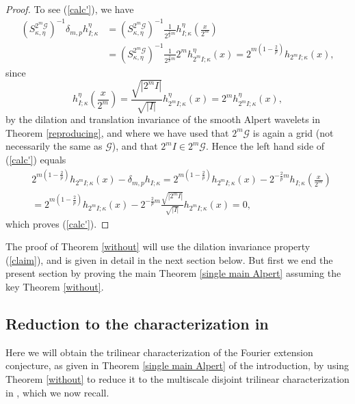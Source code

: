 \documentclass{amsart}%
\theoremstyle{plain}
\numberwithin{equation}{section}
\begin{document}
\begin{proof}
To see (\ref{calc'}), we have%
\begin{align*}
\left(  S_{\kappa,\eta}^{2^{m}\mathcal{G}}\right)  ^{-1}\delta_{m,p}%
h_{I;\kappa}^{\eta}  &  =\left(  S_{\kappa,\eta}^{2^{m}\mathcal{G}}\right)
^{-1}\frac{1}{2^{\frac{2}{p}m}}h_{I;\kappa}^{\eta}\left(  \frac{x}{2^{m}%
}\right) \\
&  =\left(  S_{\kappa,\eta}^{2^{m}\mathcal{G}}\right)  ^{-1}\frac{1}%
{2^{\frac{2}{p}m}}2^{m}h_{2^{m}I;\kappa}^{\eta}\left(  x\right)  =2^{m\left(
1-\frac{2}{p}\right)  }h_{2^{m}I;\kappa}\left(  x\right)  ,
\end{align*}
since
\[
h_{I;\kappa}^{\eta}\left(  \frac{x}{2^{m}}\right)  =\frac{\sqrt{\left\vert
2^{m}I\right\vert }}{\sqrt{\left\vert I\right\vert }}h_{2^{m}I;\kappa}^{\eta
}\left(  x\right)  =2^{m}h_{2^{m}I;\kappa}^{\eta}\left(  x\right)  ,
\]
by the dilation and translation invariance of the smooth Alpert wavelets in
Theorem \ref{reproducing}, and where we have used that $2^{m}\mathcal{G}$ is
again a grid (not necessarily the same as $\mathcal{G}$), and that $2^{m}%
I\in2^{m}\mathcal{G}$. Hence the left hand side of (\ref{calc'}) equals
\begin{align*}
&  2^{m\left(  1-\frac{2}{p}\right)  }h_{2^{m}I;\kappa}\left(  x\right)
-\delta_{m,p}h_{I;\kappa}=2^{m\left(  1-\frac{2}{p}\right)  }h_{2^{m}I;\kappa
}\left(  x\right)  -2^{-\frac{2}{p}m}h_{I;\kappa}\left(  \frac{x}{2^{m}%
}\right) \\
&  =2^{m\left(  1-\frac{2}{p}\right)  }h_{2^{m}I;\kappa}\left(  x\right)
-2^{-\frac{2}{p}m}\frac{\sqrt{\left\vert 2^{m}I\right\vert }}{\sqrt{\left\vert
I\right\vert }}h_{2^{m}I;\kappa}\left(  x\right)  =0,
\end{align*}
which proves (\ref{calc'}).
\end{proof}

The proof of Theorem \ref{without} will use the dilation invariance property
(\ref{claim}), and is given in detail in the next section below. But first we
end the present section by proving the main Theorem \ref{single main Alpert}
assuming the key Theorem \ref{without}.

\subsection{Reduction to the characterization in \cite{RiSa}}

Here we will obtain the trilinear characterization of the Fourier extension
conjecture, as given in Theorem \ref{single main Alpert} of the introduction,
by using Theorem \ref{without} to reduce it to the multiscale disjoint
trilinear characterization in \cite{RiSa}, which we now recall.
\end{document}
